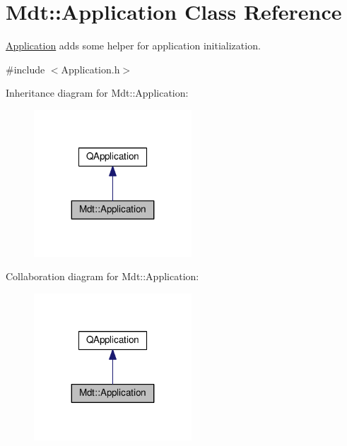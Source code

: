 \hypertarget{class_mdt_1_1_application}{}\section{Mdt\+:\+:Application Class Reference}
\label{class_mdt_1_1_application}


\hyperlink{class_mdt_1_1_application}{Application} adds some helper for application initialization.  




{\ttfamily \#include $<$Application.\+h$>$}



Inheritance diagram for Mdt\+:\+:Application\+:\nopagebreak
\begin{figure}[H]
\begin{center}
\leavevmode
\includegraphics[width=167pt]{class_mdt_1_1_application__inherit__graph}
\end{center}
\end{figure}


Collaboration diagram for Mdt\+:\+:Application\+:\nopagebreak
\begin{figure}[H]
\begin{center}
\leavevmode
\includegraphics[width=167pt]{class_mdt_1_1_application__coll__graph}
\end{center}
\end{figure}
